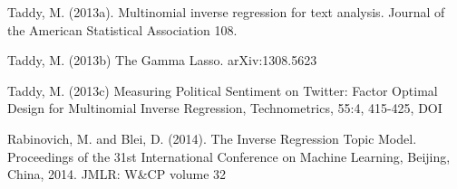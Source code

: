 \documentclass[12pt]{article}
\begin{document}
\begin{thebibliography}{99}
 Taddy, M. (2013a). Multinomial inverse regression for text analysis. Journal of the American Statistical Association 108.

 Taddy, M.  (2013b) The Gamma Lasso. arXiv:1308.5623

  Taddy, M.  (2013c) Measuring Political Sentiment on Twitter: Factor Optimal Design for Multinomial Inverse Regression, Technometrics, 55:4, 415-425, DOI

 Rabinovich, M. and Blei, D. (2014). The Inverse Regression Topic Model. Proceedings of the 31st International Conference on Machine Learning, Beijing, China, 2014. JMLR: W\&CP volume 32







\end{thebibliography}
\end{document}
